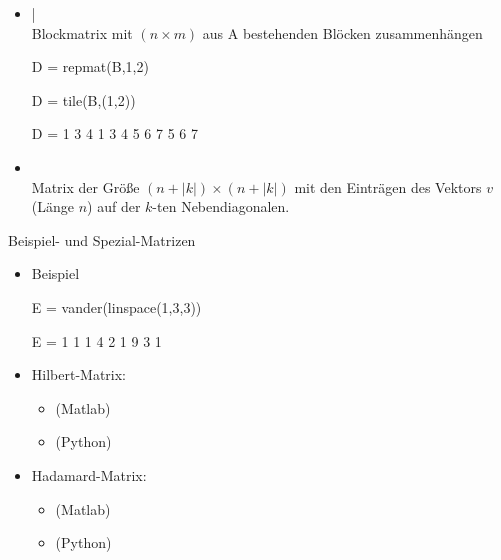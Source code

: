 \documentclass[hyperref={xetex}]{beamer}
\begin{document}
%
%
\begin{frame}[fragile]{}
\begin{itemize}
\item {}| \\ Blockmatrix mit $(n \times m)$
  aus A bestehenden Blöcken zusammenhängen
\begin{matlabin}
D = repmat(B,1,2) 
\end{matlabin}
\begin{pyin}
D = tile(B,(1,2))
\end{pyin}
\begin{matlab}
D =
     1     3     4     1     3     4
     5     6     7     5     6     7 
\end{matlab}


\item {} \\Matrix der Größe $(n+|k|) \times
  (n+|k|)$ mit den Einträgen des Vektors $v$ (Länge $n$) auf der $k$-ten Nebendiagonalen. 
\end{itemize}
\end{frame}
%
%
\begin{frame}[fragile]{Beispiel- und Spezial-Matrizen}
\begin{itemize}
\item Beispiel
\begin{matlabin}
E = vander(linspace(1,3,3))
\end{matlabin}
\begin{matlab}
E =
     1     1     1
     4     2     1
     9     3     1
\end{matlab}

\item Hilbert-Matrix: 
  \begin{itemize}
    \item {}(Matlab) 
    \item {}(Python)
  \end{itemize}
\item Hadamard-Matrix:
  \begin{itemize}
    \item {} (Matlab) 
    \item {}(Python)
  \end{itemize}
\end{itemize}
\end{frame}
\end{document}
